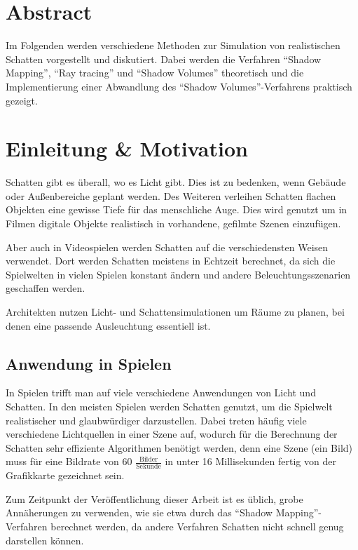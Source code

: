 \section{Abstract}

Im Folgenden werden verschiedene Methoden zur Simulation von realistischen Schatten
vorgestellt und diskutiert. Dabei werden die Verfahren "`Shadow Mapping"',
"`Ray tracing"' und "`Shadow Volumes"' theoretisch und die Implementierung
einer Abwandlung des "`Shadow Volumes"'-Verfahrens praktisch gezeigt.


\section{Einleitung \& Motivation}

Schatten gibt es überall, wo es Licht gibt. Dies ist zu bedenken, wenn
Gebäude oder Außenbereiche geplant werden.
Des Weiteren verleihen Schatten flachen Objekten eine gewisse Tiefe für das menschliche Auge.
Dies wird genutzt um in Filmen digitale Objekte realistisch in vorhandene, gefilmte Szenen einzufügen.

Aber auch in Videospielen werden Schatten auf die verschiedensten Weisen verwendet. Dort werden
Schatten meistens in Echtzeit berechnet, da sich die Spielwelten in vielen Spielen konstant ändern und andere Beleuchtungsszenarien geschaffen werden.

Architekten nutzen Licht- und Schattensimulationen um Räume zu planen, bei denen eine passende
Ausleuchtung essentiell ist.

\subsection*{Anwendung in Spielen}

In Spielen trifft man auf viele verschiedene Anwendungen von Licht und Schatten. In den meisten
Spielen werden Schatten genutzt, um die Spielwelt realistischer und glaubwürdiger darzustellen.
Dabei treten häufig viele verschiedene Lichtquellen in einer Szene auf, wodurch für die Berechnung der
Schatten sehr effiziente Algorithmen benötigt werden, denn eine Szene (ein Bild) muss für eine Bildrate
von 60 $\frac{\text{Bilder}}{\text{Sekunde}}$ in unter 16 Millisekunden fertig von der Grafikkarte gezeichnet sein.

Zum Zeitpunkt der Veröffentlichung dieser Arbeit ist es üblich, grobe Annäherungen zu verwenden,
wie sie etwa durch das "`Shadow Mapping"'-Verfahren berechnet werden, da andere Verfahren Schatten nicht schnell genug darstellen können.

